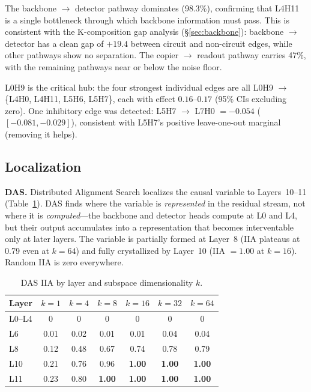 \documentclass{article}
\newcommand{\NUM}[1]{\textbf{#1}}
\begin{document}
The backbone $\to$ detector pathway dominates (98.3\%), confirming
that L4H11 is a single bottleneck through which backbone information
must pass. This is consistent with the K-composition gap analysis
(\S\ref{sec:backbone}): backbone $\to$ detector has a clean gap of
$+19.4$ between circuit and non-circuit edges, while other pathways
show no separation. The copier $\to$ readout pathway carries 47\%,
with the remaining pathways near or below the noise floor.

L0H9 is the critical hub: the four strongest individual edges are all
L0H9 $\to$ \{L4H0, L4H11, L5H6, L5H7\}, each with effect $0.16$--$0.17$
(95\% CIs excluding zero). One inhibitory edge was detected:
L5H7 $\to$ L7H0 $= -0.054$ ($[-0.081, -0.029]$), consistent with
L5H7's positive leave-one-out marginal (removing it helps).

\subsection{Localization}

\textbf{DAS.}
Distributed Alignment Search \citep{geiger2024das} localizes the causal
variable to Layers~10--11 (Table~\ref{tab:das}). DAS finds where the
variable is \emph{represented} in the residual stream, not where
it is \emph{computed}---the backbone and detector heads compute at
L0 and L4, but their output accumulates into a representation that
becomes interventable only at later layers. The variable is
partially formed at Layer~8 (IIA plateaus at 0.79 even at $k = 64$)
and fully crystallized by Layer~10 (IIA $= 1.00$ at $k = 16$). Random
IIA is zero everywhere.

\begin{table}[h]
\centering
\caption{DAS IIA by layer and subspace dimensionality $k$.}
\label{tab:das}
\begin{tabular}{lcccccc}
\toprule
\textbf{Layer} & $k{=}1$ & $k{=}4$ & $k{=}8$ & $k{=}16$ & $k{=}32$ & $k{=}64$ \\
\midrule
L0--L4 & 0 & 0 & 0 & 0 & 0 & 0 \\
L6 & 0.01 & 0.02 & 0.01 & 0.01 & 0.04 & 0.04 \\
L8 & 0.12 & 0.48 & 0.67 & 0.74 & 0.78 & 0.79 \\
L10 & 0.21 & 0.76 & 0.96 & \NUM{1.00} & \NUM{1.00} & \NUM{1.00} \\
L11 & 0.23 & 0.80 & \NUM{1.00} & \NUM{1.00} & \NUM{1.00} & \NUM{1.00} \\
\bottomrule
\end{tabular}
\end{table}
\end{document}
